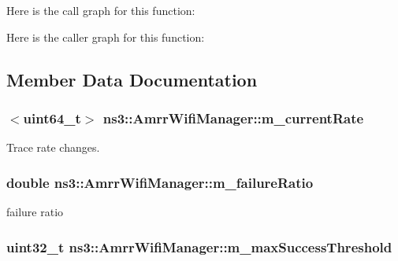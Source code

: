 Here is the call graph for this function\+:




Here is the caller graph for this function\+:




\subsection{Member Data Documentation}
\subsubsection[{\texorpdfstring{m\+\_\+current\+Rate}{m_currentRate}}]{$<$uint64\+\_\+t$>$ ns3\+::\+Amrr\+Wifi\+Manager\+::m\+\_\+current\+Rate\hspace{0.3cm}{\ttfamily [private]}}\hypertarget{classns3_1_1AmrrWifiManager_a382d0bbc09b6dfb2f9e20a0aa1fbf9c1}{}\label{classns3_1_1AmrrWifiManager_a382d0bbc09b6dfb2f9e20a0aa1fbf9c1}


Trace rate changes. 

\subsubsection[{\texorpdfstring{m\+\_\+failure\+Ratio}{m_failureRatio}}]{\setlength{\rightskip}{0pt plus 5cm}double ns3\+::\+Amrr\+Wifi\+Manager\+::m\+\_\+failure\+Ratio\hspace{0.3cm}{\ttfamily [private]}}\hypertarget{classns3_1_1AmrrWifiManager_a1e77031f6aaafd34ef3eaceef572ef64}{}\label{classns3_1_1AmrrWifiManager_a1e77031f6aaafd34ef3eaceef572ef64}


failure ratio 

\subsubsection[{\texorpdfstring{m\+\_\+max\+Success\+Threshold}{m_maxSuccessThreshold}}]{\setlength{\rightskip}{0pt plus 5cm}uint32\+\_\+t ns3\+::\+Amrr\+Wifi\+Manager\+::m\+\_\+max\+Success\+Threshold\hspace{0.3cm}{\ttfamily [private]}}\hypertarget{classns3_1_1AmrrWifiManager_a76d77816378de62ab9b6d3f773490cf9}{}\label{classns3_1_1AmrrWifiManager_a76d77816378de62ab9b6d3f773490cf9}


